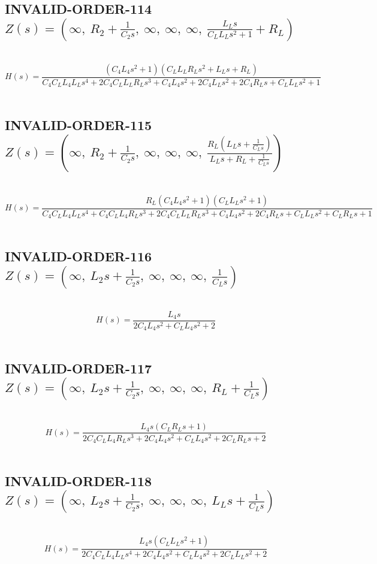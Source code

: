 \documentclass{article}
\begin{document}
\subsection{INVALID-ORDER-114 $Z(s) = \left( \infty, \  R_{2} + \frac{1}{C_{2} s}, \  \infty, \  \infty, \  \infty, \  \frac{L_{L} s}{C_{L} L_{L} s^{2} + 1} + R_{L}\right)$ } \ 
\textbf{\[H(s) = \frac{\left(C_{4} L_{4} s^{2} + 1\right) \left(C_{L} L_{L} R_{L} s^{2} + L_{L} s + R_{L}\right)}{C_{4} C_{L} L_{4} L_{L} s^{4} + 2 C_{4} C_{L} L_{L} R_{L} s^{3} + C_{4} L_{4} s^{2} + 2 C_{4} L_{L} s^{2} + 2 C_{4} R_{L} s + C_{L} L_{L} s^{2} + 1}\] } \ 
\subsection{INVALID-ORDER-115 $Z(s) = \left( \infty, \  R_{2} + \frac{1}{C_{2} s}, \  \infty, \  \infty, \  \infty, \  \frac{R_{L} \left(L_{L} s + \frac{1}{C_{L} s}\right)}{L_{L} s + R_{L} + \frac{1}{C_{L} s}}\right)$ } \ 
\textbf{\[H(s) = \frac{R_{L} \left(C_{4} L_{4} s^{2} + 1\right) \left(C_{L} L_{L} s^{2} + 1\right)}{C_{4} C_{L} L_{4} L_{L} s^{4} + C_{4} C_{L} L_{4} R_{L} s^{3} + 2 C_{4} C_{L} L_{L} R_{L} s^{3} + C_{4} L_{4} s^{2} + 2 C_{4} R_{L} s + C_{L} L_{L} s^{2} + C_{L} R_{L} s + 1}\] } \ 
\subsection{INVALID-ORDER-116 $Z(s) = \left( \infty, \  L_{2} s + \frac{1}{C_{2} s}, \  \infty, \  \infty, \  \infty, \  \frac{1}{C_{L} s}\right)$ } \ 
\textbf{\[H(s) = \frac{L_{4} s}{2 C_{4} L_{4} s^{2} + C_{L} L_{4} s^{2} + 2}\] } \ 
\subsection{INVALID-ORDER-117 $Z(s) = \left( \infty, \  L_{2} s + \frac{1}{C_{2} s}, \  \infty, \  \infty, \  \infty, \  R_{L} + \frac{1}{C_{L} s}\right)$ } \ 
\textbf{\[H(s) = \frac{L_{4} s \left(C_{L} R_{L} s + 1\right)}{2 C_{4} C_{L} L_{4} R_{L} s^{3} + 2 C_{4} L_{4} s^{2} + C_{L} L_{4} s^{2} + 2 C_{L} R_{L} s + 2}\] } \ 
\subsection{INVALID-ORDER-118 $Z(s) = \left( \infty, \  L_{2} s + \frac{1}{C_{2} s}, \  \infty, \  \infty, \  \infty, \  L_{L} s + \frac{1}{C_{L} s}\right)$ } \ 
\textbf{\[H(s) = \frac{L_{4} s \left(C_{L} L_{L} s^{2} + 1\right)}{2 C_{4} C_{L} L_{4} L_{L} s^{4} + 2 C_{4} L_{4} s^{2} + C_{L} L_{4} s^{2} + 2 C_{L} L_{L} s^{2} + 2}\] } \ 
\end{document}
